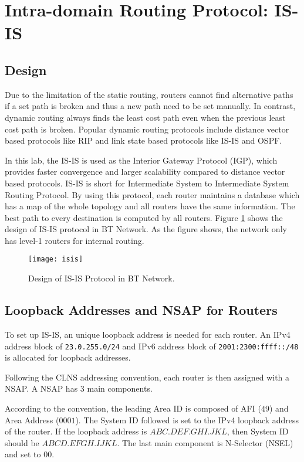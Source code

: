 \section{Intra-domain Routing Protocol: IS-IS}
\label{sec:isis}

\subsection{Design}

Due to the limitation of the static routing, routers cannot find alternative paths if a set path is broken and thus a new path need to be set manually. 
In contrast, dynamic routing always finds the least cost path even when the previous least cost path is broken.
Popular dynamic routing protocols include distance vector based protocols like RIP and link state based protocols like IS-IS and OSPF. 

In this lab, the IS-IS is used as the Interior Gateway Protocol (IGP), which provides faster convergence and larger scalability compared to distance vector based protocols. 
IS-IS is short for Intermediate System to Intermediate System Routing Protocol.
By using this protocol, each router maintains a database which has a map of the whole topology and all routers have the same information. The best path to every destination is computed by all routers. 
Figure \ref{fig:isis} shows the design of IS-IS protocol in BT Network. As the figure shows, the network only has level-1 routers for internal routing.

\begin{figure}[ht!]
    \centering
    \texttt{[image: isis]}
    \caption{Design of IS-IS Protocol in BT Network.}
    \label{fig:isis}
\end{figure}

\subsection{Loopback Addresses and NSAP for Routers}

To set up IS-IS, an unique loopback address is needed for each router. 
An IPv4 address block of \texttt{23.0.255.0/24} and IPv6 address block of \texttt{2001:2300:ffff::/48} is allocated for loopback addresses. 

Following the CLNS addressing convention, each router is then assigned with a NSAP. A NSAP has $3$ main components. 

According to the convention, the leading Area ID is composed of AFI ($49$) and Area Address ($0001$). 
The System ID followed is set to the IPv4 loopback address of the router. If the loopback address is $ABC.DEF.GHI.JKL$, then System ID should be $ABCD.EFGH.IJKL$.
The last main component is N-Selector (NSEL) and set to $00$.

